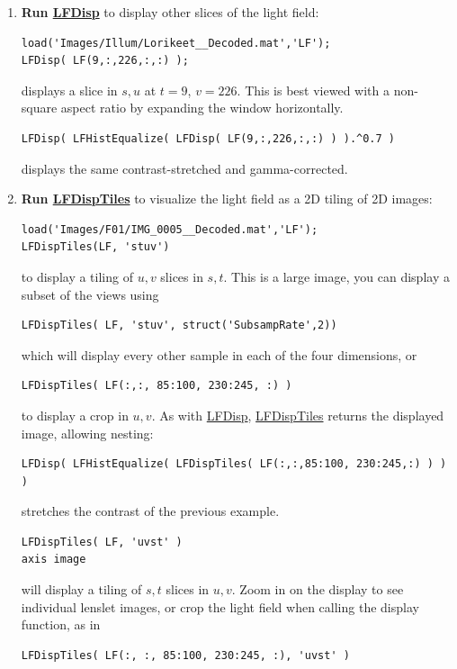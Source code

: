 \documentclass[onecolumn]{article}
\newcommand{\CiteFunc}[1]{\hyperlink{#1}{\small #1}}
\begin{document}
\begin{enumerate}[leftmargin=1.5em,rightmargin=0.5cm]
\item \textbf{Run \CiteFunc{LFDisp}} to display other slices of the light field:
\begin{Verbatim}
load('Images/Illum/Lorikeet__Decoded.mat','LF');
LFDisp( LF(9,:,226,:,:) );
\end{Verbatim}
displays a slice in $s,u$ at $t = 9$, $v = 226$. This is best viewed with a non-square aspect ratio by expanding the window horizontally.
\begin{Verbatim}
LFDisp( LFHistEqualize( LFDisp( LF(9,:,226,:,:) ) ).^0.7 )
\end{Verbatim}
displays the same contrast-stretched and gamma-corrected.

\item \textbf{Run \CiteFunc{LFDispTiles}} to visualize the light field as a 2D tiling of 2D images:
\begin{Verbatim}
load('Images/F01/IMG_0005__Decoded.mat','LF');
LFDispTiles(LF, 'stuv')
\end{Verbatim}
to display a tiling of $u,v$ slices in $s,t$. This is a large image, you can display a subset of the views using
\begin{Verbatim}
LFDispTiles( LF, 'stuv', struct('SubsampRate',2))
\end{Verbatim}
which will display every other sample in each of the four dimensions, or 
\begin{Verbatim}
LFDispTiles( LF(:,:, 85:100, 230:245, :) )
\end{Verbatim}
to display a crop in $u,v$. As with \CiteFunc{LFDisp}, \CiteFunc{LFDispTiles} returns the displayed image, allowing nesting:
\begin{Verbatim}
LFDisp( LFHistEqualize( LFDispTiles( LF(:,:,85:100, 230:245,:) ) ) )
\end{Verbatim}
stretches the contrast of the previous example.
\begin{Verbatim}
LFDispTiles( LF, 'uvst' )
axis image
\end{Verbatim}
will display a tiling of $s,t$ slices in $u,v$. Zoom in on the display to see individual lenslet images, or crop the light field when calling the display function, as in
\begin{Verbatim}
LFDispTiles( LF(:, :, 85:100, 230:245, :), 'uvst' )
\end{Verbatim}


\end{enumerate}
\end{document}

